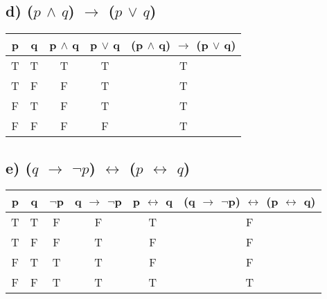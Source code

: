 \documentclass[11pt, oneside]{article} %
\numberwithin{equation}{section} %
\numberwithin{figure}{section} %
\numberwithin{table}{section} %
\begin{document}
\begin{table}[!htp]
\subsection{d) ($p$  $\wedge$ $q$) $\rightarrow$ ($p$ $\vee$ $q$)}
\begin{tabular}{c c c c c}
\hline\hline
p & q & p  $\wedge$ q & p $\vee$ q & (p  $\wedge$ q) $\rightarrow$ (p $\vee$ q) \\ [0.5ex] %
\hline
T & T & T & T & T\\
T & F & F & T & T\\
F & T & F  & T & T\\
F & F & F & F & T\\ [1ex]
\hline
\end{tabular}
\label{table:nonlin}
\end{table}

\begin{table}[!htp]
\subsection{e) ($q$ $\rightarrow$ $\neg$$p$) $\leftrightarrow$ ($p$ $\leftrightarrow$ $q$)}
\begin{tabular}{c c c c c c}
\hline\hline
p & q & $\neg$p & q $\rightarrow$ $\neg$p & p $\leftrightarrow$ q & (q $\rightarrow$ $\neg$p) $\leftrightarrow$ (p $\leftrightarrow$ q) \\ [0.5ex] %
\hline
T & T & F & F & T & F\\
T & F & F & T & F & F\\
F & T & T & T & F & F\\
F & F & T & T & T & T \\ [1ex]
\hline
\end{tabular}
\label{table:nonlin}
\end{table}
\end{document}
